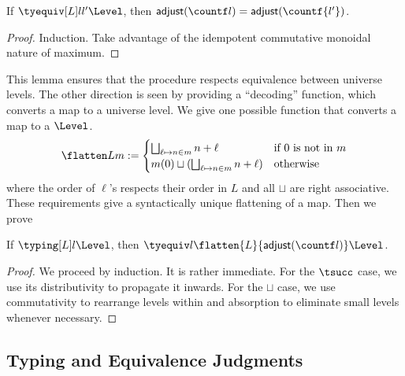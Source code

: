 \begin{lemma}
  If $\tyequiv[L]l{l'}\Level$, then $\adjustf{\countf l} = \adjustf{\countf{l'}}$.
\end{lemma}
\begin{proof}
  Induction. Take advantage of the idempotent commutative monoidal nature of maximum. 
\end{proof}
This lemma ensures that the procedure respects equivalence between universe levels. %
The other direction is seen by providing a ``decoding'' function, which converts a map
to a universe level. %
We give one possible function that converts a map to a $\Level$.
\begin{align*}
  \flatten L m := \begin{cases}
    \bigsqcup_{\ell \mapsto n \in m} n + \ell & \text{if $0$ is not in $m$} \\
    m(0) \sqcup (\bigsqcup_{\ell \mapsto n \in m} n + \ell)
    & \text{otherwise}
  \end{cases}
\end{align*}
where the order of $\ell$'s respects their order in $L$ and all $\sqcup$ are right
associative. %
These requirements give a syntactically unique flattening of a map. %
Then we prove
\begin{lemma}
  If $\typing[L]l\Level$, then $\tyequiv l{\flatten{L}{\adjustf{\countf l}}}\Level$. 
\end{lemma}
\begin{proof}
  We proceed by induction. %
  It is rather immediate. For the $\tsucc$ case, we use its distributivity to
  propagate it inwards. For the $\sqcup$ case, we use commutativity to rearrange levels
  within and absorption to eliminate small levels whenever necessary.
\end{proof}

\subsection{Typing and Equivalence Judgments}

